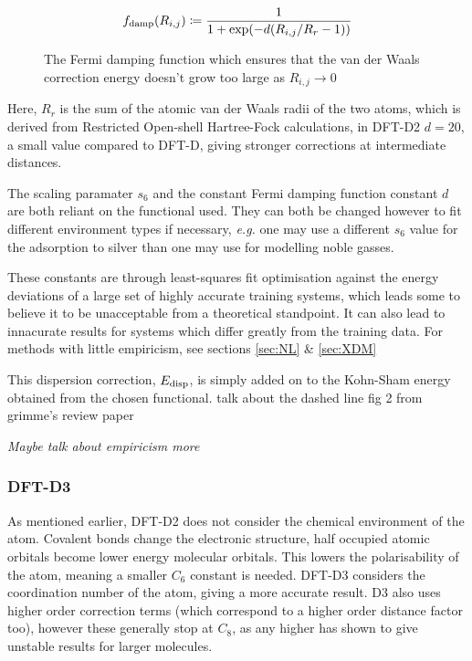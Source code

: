 \documentclass[10pt,a4paper,twocolumn,twoside]{extarticle}
\begin{document}
	\begin{align} \label{eq:damp}
		f_{\rm damp}(R_{i,j}) \coloneqq \frac{1}{1+\exp(-d(R_{i,j}/R_r -1))}
	\end{align}

	\begin{figure}
		\caption{The Fermi damping function which ensures that the van der Waals correction energy doesn't grow too large as $R_{i,j} \rightarrow 0$}
		\label{fig:Fermi}
	\end{figure}
	Here, $R_r$ is the sum of the atomic van der Waals radii of the two atoms, which is derived from Restricted Open-shell Hartree-Fock calculations, in DFT-D2 $d = 20$, a small value compared to DFT-D, giving stronger corrections at intermediate distances. 

	The scaling paramater $s_6$ and the constant Fermi damping function constant $d$ are both reliant on the functional used. They can both be changed however to fit different environment types if necessary, \emph{e.g.} one may use a different $s_6$ value for the adsorption to silver\cite{Schiavo2018} than one may use for modelling noble gasses.  

	These constants are through least-squares fit optimisation against the energy deviations of a large set of highly accurate training systems, which leads some to believe it to be unacceptable from a theoretical standpoint. It can also lead to innacurate results for systems which differ greatly from the training data.\cite{Sato2009}\cite{Grimme2010}\cite{Jones2015} For methods with little empiricism, see sections \ref{sec:NL} \& \ref{sec:XDM}

	This dispersion correction, $E_{\rm disp}$, is simply added on to the Kohn-Sham energy obtained from the chosen functional.
	\color{red}talk about the dashed line fig 2 from grimme's review paper \color{black}

	\emph{Maybe talk about empiricism more}


	\subsubsection{DFT-D3}
	\label{sec:D3}
	As mentioned earlier, DFT-D2 does not consider the chemical environment of the atom. Covalent bonds change the electronic structure, half occupied atomic orbitals become lower energy molecular orbitals. This lowers the polarisability of the atom, meaning a smaller $C_6$ constant is needed. DFT-D3 considers the coordination number of the atom, giving a more accurate result. \cite{Grimme2010} D3 also uses higher order correction terms (which correspond to a higher order distance factor too), however these generally stop at $C_8$, as any higher has shown to give unstable results for larger molecules.
\end{document}
